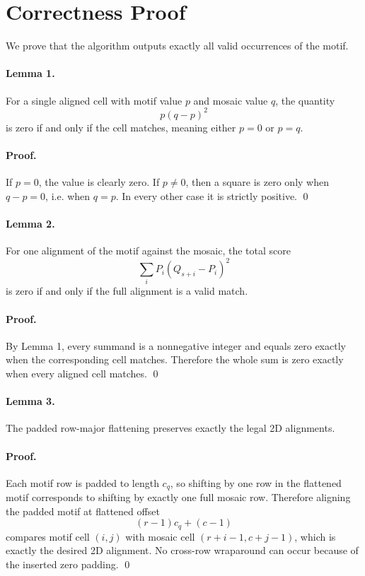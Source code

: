\documentclass[11pt]{article}
\begin{document}
\section*{Correctness Proof}

We prove that the algorithm outputs exactly all valid occurrences of the motif.

\paragraph{Lemma 1.}
For a single aligned cell with motif value $p$ and mosaic value $q$, the quantity
\[
    p(q-p)^2
\]
is zero if and only if the cell matches, meaning either $p=0$ or $p=q$.

\paragraph{Proof.}
If $p=0$, the value is clearly zero. If $p \ne 0$, then a square is zero only when $q-p=0$, i.e. when
$q=p$. In every other case it is strictly positive. \qed

\paragraph{Lemma 2.}
For one alignment of the motif against the mosaic, the total score
\[
    \sum_i P_i(Q_{s+i}-P_i)^2
\]
is zero if and only if the full alignment is a valid match.

\paragraph{Proof.}
By Lemma 1, every summand is a nonnegative integer and equals zero exactly when the corresponding cell
matches. Therefore the whole sum is zero exactly when every aligned cell matches. \qed

\paragraph{Lemma 3.}
The padded row-major flattening preserves exactly the legal 2D alignments.

\paragraph{Proof.}
Each motif row is padded to length $c_q$, so shifting by one row in the flattened motif corresponds to
shifting by exactly one full mosaic row. Therefore aligning the padded motif at flattened offset
\[
    (r-1)c_q + (c-1)
\]
compares motif cell $(i,j)$ with mosaic cell $(r+i-1,c+j-1)$, which is exactly the desired 2D alignment.
No cross-row wraparound can occur because of the inserted zero padding. \qed
\end{document}
